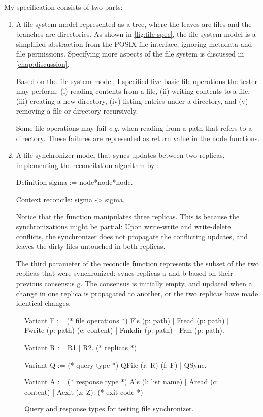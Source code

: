 My specification consists of two parts:
\begin{enumerate}
  \item A file system model represented as a tree, where the leaves are files
    and the branches are directories.  As shown in \autoref{fig:file-spec}, the
    file system model is a simplified abstraction from the POSIX file interface,
    ignoring metadata and file permissions.  Specifying more aspects of the file
    system is discussed in \autoref{chap:discussion}.

    Based on the file system model, I specified five basic file operations
    the tester may perform: (i) reading contents from a file, (ii) writing
    contents to a file, (iii) creating a new directory, (iv) listing entries
    under a directory, and (v) removing a file or directory recursively.

    Some file operations may fail {\it e.g.} when reading from a path that
    refers to a directory.  These failures are represented as return value
     in the node functions.
  \item A file synchronizer model that syncs updates between two replicas,
    implementing the reconcilation algorithm by \citet{what-sync}:
\begin{coq}
  Definition sigma := node*node*node.
      
  Context reconcile: sigma -> sigma.
\end{coq}
Notice that the  function manipulates three replicas.  This is
because the synchronizations might be partial: Upon write-write and write-delete
conflicts, the synchronizer does not propagate the conflicting updates, and
leaves the dirty files untouched in both replicas.

The third parameter of the reconcile function represents the subset of the two
replicas that were synchronized:  syncs replicas \ilc a
and \ilc b based on their previous consensus \ilc g.  The consensus is initially
empty, and updated when a change in one replica is propagated to another, or the
two replicas have made identical changes.
\end{enumerate}

\begin{figure}
\begin{coq}
  Variant F :=        (* file operations *)
  Fls    (p: path)
| Fread  (p: path)
| Fwrite (p: path) (c: content)
| Fmkdir (p: path)
| Frm    (p: path).

Variant R := R1 | R2. (* replicas      *)

Variant Q :=          (* query type    *)
  QFile (r: R) (f: F)
| QSync.

Variant A :=          (* response type *)
  Als   (l: list name)
| Aread (c: content)
| Aexit (z: Z).       (* exit code     *)
\end{coq}
\caption{Query and response types for testing file synchronizer.}
\label{fig:file-type}
\end{figure}

